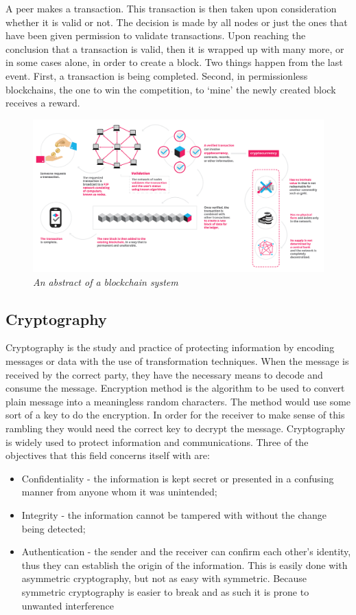 \documentclass[a4paper,11pt]{report}
\begin{document}
A peer makes a transaction. This transaction is then taken upon consideration whether it is valid or not. The decision is made by all nodes or just the ones that have been given permission to validate transactions. Upon reaching the conclusion that a transaction is valid,  then it is wrapped up with many more, or in some cases alone, in order to create a block. Two things happen from the last event. First, a transaction is being completed. Second, in permissionless blockchains, the one to win the competition, to ‘mine’ the newly created block receives a reward. 

\begin{figure}[h]
\centering
  \includegraphics[width=16cm]{infographics0517-01-1.png}
  \caption{\textit{An abstract of a blockchain system \cite{whatIsBlockgeeks}}}
  \label{blockchainAbstract}
\end{figure}

\subsection{Cryptography}
Cryptography is the study and practice of protecting information by encoding messages or data with the use of transformation techniques. When the message is received by the correct party, they have the necessary means to decode and consume the message. 
	Encryption method is the algorithm to be used to convert plain message into a meaningless random characters. The method would use some sort of a key to do the encryption. In order for the receiver to make sense of this rambling they would need the correct key to decrypt the message.\cite{cryptolecture} Cryptography is widely used to protect information and communications. Three of the objectives that this field concerns itself with are: 
\begin{itemize}

\item Confidentiality - the information is kept secret or presented in a confusing manner from anyone whom it was unintended; 
\item Integrity - the information cannot be tampered with without the change being detected;
\item Authentication - the sender and the receiver can confirm each other’s identity, thus they can establish the origin of the information. This is easily done with asymmetric cryptography, but not as easy with symmetric. Because symmetric cryptography is easier to break and as such it is prone to unwanted interference
\end{itemize}
\end{document}
